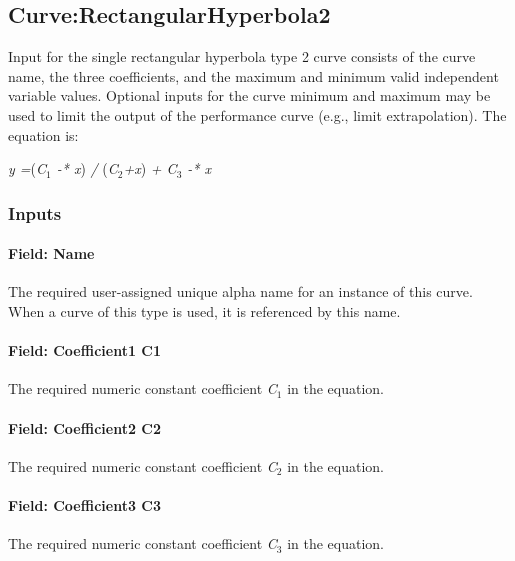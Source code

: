 \subsection{Curve:RectangularHyperbola2}\label{curverectangularhyperbola2}

Input for the single rectangular hyperbola type 2 curve consists of the curve name, the three coefficients, and the maximum and minimum valid independent variable values. Optional inputs for the curve minimum and maximum may be used to limit the output of the performance curve (e.g., limit extrapolation). The equation is:

\emph{y =}(\emph{C\(_{1}\) -* x}) \emph{/} (\emph{C\(_{2}\)+x}) \emph{+ C\(_{3}\) -* x}

\subsubsection{Inputs}\label{inputs-16-007}

\paragraph{Field: Name}\label{field-name-16-005}

The required user-assigned unique alpha name for an instance of this curve. When a curve of this type is used, it is referenced by this name.

\paragraph{Field: Coefficient1 C1}\label{field-coefficient1-c1-3}

The required numeric constant coefficient \emph{C\(_{1}\)} in the equation.

\paragraph{Field: Coefficient2 C2}\label{field-coefficient2-c2-3}

The required numeric constant coefficient \emph{C\(_{2}\)} in the equation.

\paragraph{Field: Coefficient3 C3}\label{field-coefficient3-c3-3}

The required numeric constant coefficient \emph{C\(_{3}\)} in the equation.

